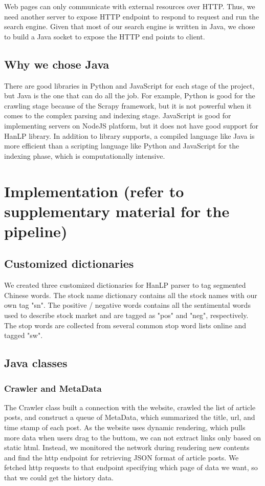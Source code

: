 \documentclass{article}
\begin{document}
Web pages can only communicate with external resources over HTTP. Thus, we need another server to expose HTTP endpoint to respond to request and run the search engine. Given that most of our search engine is written in Java, we chose to build a Java socket to expose the HTTP end points to client.

\subsection{Why we chose Java}
There are good libraries in Python and JavaScript for each stage of the project, but Java is the one that can do all the job. For example, Python is good for the crawling stage because of the Scrapy framework, but it is not powerful when it comes to the complex parsing and indexing stage. JavaScript is good for implementing servers on NodeJS platform, but it does not have good support for HanLP library. In addition to library supports, a compiled language like Java is more efficient than a scripting language like Python and JavaScript for the indexing phase, which is computationally intensive.

\section{Implementation (refer to supplementary material for the pipeline)}
\subsection{Customized dictionaries}
We created three customized dictionaries for HanLP parser to tag segmented Chinese words. The stock name dictionary contains all the stock names with our own tag "sn". The positive / negative words contains all the sentimental words used to describe stock market and are tagged as "pos" and "neg", respectively. The stop words are collected from several common stop word lists online and tagged "sw".

\subsection{Java classes}
\subsubsection{Crawler and MetaData}
The Crawler class built a connection with the website, crawled the list of article posts, and construct a queue of MetaData, which summarized the title, url, and time stamp of each post. As the website uses dynamic rendering, which pulls more data when users drag to the buttom, we can not extract links only based on static html. Instead, we monitored the network during rendering new contents and find the http endpoint for retrieving JSON format of article posts. We fetched http requests to that endpoint specifying which page of data we want, so that we could get the history data.
\end{document}
